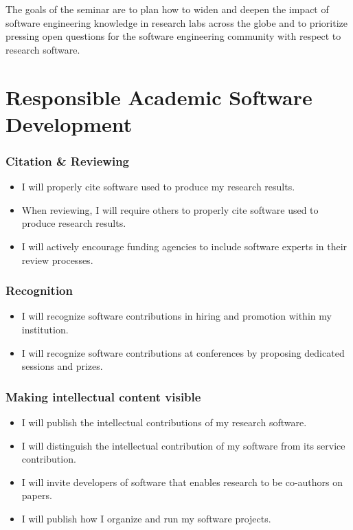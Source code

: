 \documentclass[a4paper,UKenglish]{dagman}
\renewcommand{\paragraph}[1]{\subsubsection*{#1}\xspace}
\begin{document}
The goals of the seminar are to plan how to widen and deepen the impact of software engineering knowledge in research labs across the globe and to prioritize pressing open questions for the software engineering community with respect to research software.

\section{Responsible Academic Software Development}




\paragraph{Citation \& Reviewing}
\begin{itemize}
\item I will properly cite software used to produce my research results.
\item When reviewing, I will require others to properly cite software used to produce research results.
\item I will actively encourage funding agencies to include software experts in their review processes.
\end{itemize}

\paragraph{Recognition}
\begin{itemize}
\item I will recognize software contributions in hiring and promotion within my institution.
\item I will recognize software contributions at conferences by proposing dedicated sessions and prizes.
\end{itemize}

\paragraph{Making intellectual content visible}
\begin{itemize}
\item I will publish the intellectual contributions of my research software.
\item I will distinguish the intellectual contribution of my software from its service contribution.
\item I will invite developers of software that enables research to be co-authors on papers.
\item I will publish how I organize and run my software projects.
\end{itemize}
\end{document}
